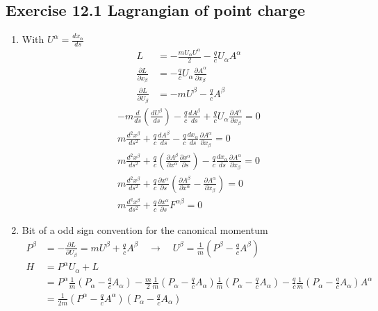 \documentclass[../main.tex]{subfiles}
\begin{document}
\subsection{Exercise 12.1 Lagrangian of point charge}
\begin{enumerate}
\item With $U^\alpha=\frac{dx_\alpha}{ds}$
\begin{align}
	L&=-\frac{mU_\alpha U^\alpha}{2}-\frac{q}{c}U_\alpha A^\alpha\\
	\frac{\partial L}{\partial x_\beta}&=-\frac{q}{c}U_\alpha\frac{\partial A^\alpha}{\partial x_\beta}\\
	\frac{\partial L}{\partial U_\beta}&=-mU^\beta-\frac{q}{c}A^\beta
\end{align}
\begin{align}
	-m\frac{d}{ds}\left(\frac{dU^\beta}{ds}\right)-\frac{q}{c}\frac{dA^\beta}{ds}+\frac{q}{c}U_\alpha\frac{\partial A^\alpha}{\partial x_\beta}=0\\
	m\frac{d^2x^\beta}{ds^2}+\frac{q}{c}\frac{dA^\beta}{ds}-\frac{q}{c}\frac{dx_\alpha}{ds}\frac{\partial A^\alpha}{\partial x_\beta}=0\\
	m\frac{d^2x^\beta}{ds^2}+\frac{q}{c}\left(\frac{\partial A^\beta}{\partial x^\alpha}\frac{\partial x^\alpha}{\partial s}\right)-\frac{q}{c}\frac{dx_\alpha}{ds}\frac{\partial A^\alpha}{\partial x_\beta}=0\\
	m\frac{d^2x^\beta}{ds^2}+\frac{q}{c}\frac{\partial x^\alpha}{\partial s}\left(\frac{\partial A^\beta}{\partial x^\alpha}-\frac{\partial A^\alpha}{\partial x_\beta}\right)=0\\
	m\frac{d^2x^\beta}{ds^2}+\frac{q}{c}\frac{\partial x^\alpha}{\partial s}F^{\alpha\beta}=0
\end{align}
\item Bit of a odd sign convention for the canonical momentum
\begin{align}
P^\beta&=-\frac{\partial L}{\partial U_\beta}=mU^\beta+\frac{q}{c}A^\beta\quad\rightarrow\quad U^\beta=\frac{1}{m}\left(P^\beta-\frac{q}{c}A^\beta\right)\\
H&=P^\alpha U_\alpha+L\\
&=P^\alpha\frac{1}{m}\left(P_\alpha-\frac{q}{c}A_\alpha\right)-\frac{m}{2}\frac{1}{m}\left(P_\alpha-\frac{q}{c}A_\alpha\right)\frac{1}{m}\left(P_\alpha-\frac{q}{c}A_\alpha\right)-\frac{q}{c}\frac{1}{m}\left(P_\alpha-\frac{q}{c}A_\alpha\right)A^\alpha\\
&=\frac{1}{2m}\left(P^\alpha-\frac{q}{c}A^\alpha\right)\left(P_\alpha-\frac{q}{c}A_\alpha\right)

\end{align}
\end{enumerate}
\end{document}

